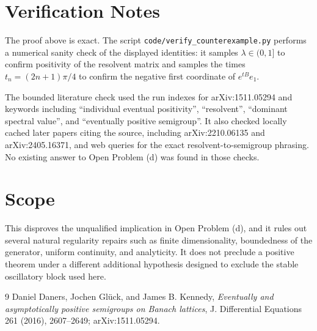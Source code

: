 \documentclass[11pt]{article}
\begin{document}
\section*{Verification Notes}

The proof above is exact. The script
\texttt{code/verify\_counterexample.py} performs a numerical sanity check of
the displayed identities: it samples $\lambda\in(0,1]$ to confirm positivity of
the resolvent matrix and samples the times $t_n=(2n+1)\pi/4$ to confirm the
negative first coordinate of $e^{tB}e_1$.

The bounded literature check used the run indexes for arXiv:1511.05294 and
keywords including ``individual eventual positivity'', ``resolvent'',
``dominant spectral value'', and ``eventually positive semigroup''. It also
checked locally cached later papers citing the source, including arXiv:2210.06135
and arXiv:2405.16371, and web queries for the exact resolvent-to-semigroup
phrasing. No existing answer to Open Problem (d) was found in those checks.

\section*{Scope}

This disproves the unqualified implication in Open Problem (d), and it rules
out several natural regularity repairs such as finite dimensionality,
boundedness of the generator, uniform continuity, and analyticity. It does not
preclude a positive theorem under a different additional hypothesis designed to
exclude the stable oscillatory block used here.

\begin{thebibliography}{9}
Daniel Daners, Jochen Gl\"uck, and James B. Kennedy,
\emph{Eventually and asymptotically positive semigroups on Banach lattices},
J. Differential Equations 261 (2016), 2607--2649; arXiv:1511.05294.
\end{thebibliography}
\end{document}
